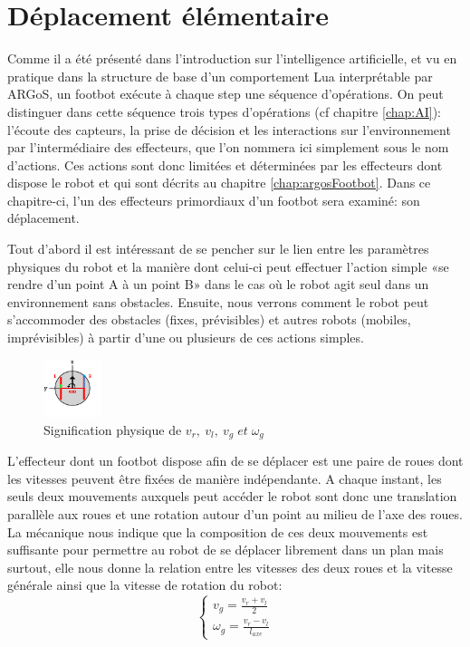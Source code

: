 \section{Déplacement élémentaire}

Comme il a été présenté dans l'introduction sur l'intelligence artificielle, et vu en pratique dans la structure de base d'un comportement Lua interprétable par ARGoS, un footbot exécute à chaque step une séquence d'opérations. On peut distinguer dans cette séquence trois types d'opérations (cf chapitre \ref{chap:AI}): l'écoute des capteurs, la prise de décision et les interactions sur l'environnement par l'intermédiaire des effecteurs, que l'on nommera ici simplement sous le nom d'actions. Ces actions sont donc limitées et déterminées par les effecteurs dont dispose le robot et qui sont décrits au chapitre \ref{chap:argosFootbot}. Dans ce chapitre-ci, l'un des effecteurs primordiaux d'un footbot sera examiné: son déplacement.

Tout d'abord il est intéressant de se pencher sur le lien entre les paramètres physiques du robot et la manière dont celui-ci peut effectuer l'action simple «se rendre d'un point A à un point B» dans le cas où le robot agit seul dans un environnement sans obstacles. Ensuite, nous verrons comment le robot peut s’accommoder des obstacles (fixes, prévisibles) et autres robots (mobiles, imprévisibles) à partir d'une ou plusieurs de ces actions simples.

\begin{figure}
  \vspace{-3em}
  \begin{center}
    \includegraphics[width=0.15\textwidth]{robotWheels.png}
  \end{center}
  \caption{Signification physique de \(v_r,\: v_l,\: v_g \; et \; \omega_g \) \cite{argosSite1}}
  \vspace{-2em}
  \end{figure}
L'effecteur dont un footbot dispose afin de se déplacer est une paire de roues dont les vitesses peuvent être fixées de manière indépendante. A chaque instant, les seuls deux mouvements auxquels peut accéder le robot sont donc une translation parallèle aux roues et une rotation autour d'un point au milieu de l'axe des roues. La mécanique \cite{meca} nous indique que la composition de ces deux mouvements est suffisante pour permettre au robot de se déplacer librement dans un plan mais surtout, elle nous donne la relation entre les vitesses des deux roues et la vitesse générale ainsi que la vitesse de rotation du robot:
\begin{equation}
\begin{cases}
v_g=\frac{v_r+v_l}{2}\\
\omega_g=\frac{v_r-v_l}{l_{axe}}
\end{cases}  
\end{equation}

